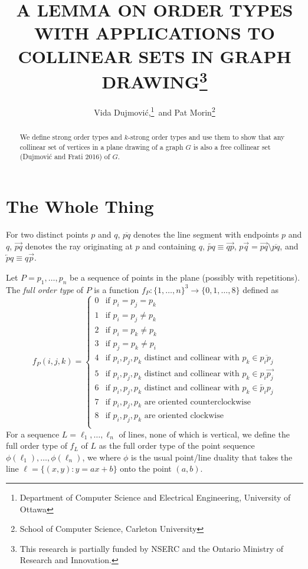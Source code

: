 \documentclass{patmorin}
\title{\MakeUppercase{A Lemma on Order Types with Applications to Collinear Sets in Graph Drawing}\thanks{This research is partially funded by NSERC and the Ontario Ministry of Research and Innovation.}}
\author{Vida Dujmovi\'c,\thanks{Department of Computer Science and Electrical Engineering, University of Ottawa}\, and Pat Morin\thanks{School of Computer Science, Carleton University}}
\begin{document}
\maketitle


\begin{abstract}
  We define strong order types and $k$-strong order types and use them to
  show that any collinear set of vertices in a plane drawing of a graph
  $G$ is also a free collinear set (Dujmovi\'c and Frati 2016) of $G$.
\end{abstract}


\section{The Whole Thing}

For two distinct points $p$ and $q$,
$\overline{pq}$ denotes the line segment with endpoints $p$ and
$q$, $\overrightarrow{pq}$ denotes the ray originating at $p$ and
containing $q$, $\overleftarrow{pq}\equiv \overrightarrow{qp}$, 
$p\!\overrightarrow{q} = \overrightarrow{pq}\setminus \overline{pq}$, 
and $\overleftarrow{p}\!q\equiv q\overrightarrow{p}$.

Let $P=p_1,\ldots,p_n$ be a sequence of points in the plane (possibly
with repetitions).  The \emph{full order type} of $P$ is a function
$f_P\colon \{1,\ldots,n\}^3\to \{0,1,\ldots,8\}$ defined as
\[
   f_P(i,j,k) = 
   \begin{cases}
      0 & \text{if $p_i=p_j=p_k$} \\
      1 & \text{if $p_i=p_j\neq p_k$} \\
      2 & \text{if $p_i=p_k\neq p_k$} \\
      3 & \text{if $p_j=p_k\neq p_i$} \\
      4 & \text{if $p_i,p_j,p_k$ distinct and collinear with $p_k\in\overline{p_ip_j}$} \\
      5 & \text{if $p_i,p_j,p_k$ distinct and collinear with $p_k\in p_i\!\overrightarrow{p_j}$} \\
      6 & \text{if $p_i,p_j,p_k$ distinct and collinear with $p_k\in\overleftarrow{p_i}\!p_j$} \\
      7 & \text{if $p_i,p_j,p_k$ are oriented counterclockwise} \\
      8 & \text{if $p_i,p_j,p_k$ are oriented clockwise} \\
   \end{cases}
\]
For a sequence $L=\ell_1,\ldots,\ell_n$ of lines, none of which is
vertical, we define the full order type of $f_L$ of $L$ as the full
order type of the point sequence $\phi(\ell_1),\ldots,\phi(\ell_n)$,
we where $\phi$ is the usual point/line duality that takes the line
$\ell=\{(x,y): y=ax+b\}$ onto the point $(a,b)$.
\end{document}
